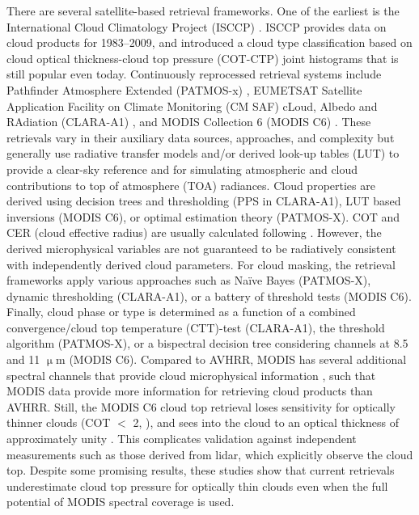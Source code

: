 There are several satellite-based retrieval frameworks. One of the earliest is the International Cloud Climatology Project (ISCCP) \citep{Rossow99}. ISCCP provides data on cloud products for 1983--2009, and introduced a cloud type classification based on cloud optical thickness-cloud top pressure (COT-CTP) joint histograms that is still popular even today. Continuously reprocessed retrieval systems include Pathfinder Atmosphere Extended (PATMOS-x) \citep{Heidinger09,Heidinger12}, EUMETSAT Satellite Application Facility on Climate Monitoring (CM SAF) cLoud, Albedo and RAdiation (CLARA-A1) \citep{Karlsson13}, and MODIS Collection 6 (MODIS C6) \citep{Platnick17}. These retrievals vary in their auxiliary data sources, approaches, and complexity but generally use radiative transfer models and/or derived look-up tables (LUT) to provide a clear-sky reference and for simulating atmospheric and cloud contributions to top of atmosphere (TOA) radiances. Cloud properties are derived using decision trees and thresholding (PPS in CLARA-A1), LUT based inversions (MODIS C6), or optimal estimation theory (PATMOS-X). COT and CER (cloud effective radius) are usually calculated following \citet{Nakajima90}. However, the derived microphysical variables are not guaranteed to be radiatively consistent with independently derived cloud parameters. For cloud masking, the retrieval frameworks apply various approaches such as Na\"{i}ve Bayes (PATMOS-X), dynamic thresholding (CLARA-A1), or a battery of threshold tests (MODIS C6). Finally, cloud phase or type is determined as a function of a combined convergence/cloud top temperature (CTT)-test (CLARA-A1), the \citet{Pavolonis05} threshold algorithm (PATMOS-X), or a bispectral decision tree considering channels at 8.5 and 11 $\upmu$m (MODIS C6). Compared to AVHRR, MODIS has several additional spectral channels that provide cloud microphysical information \citep{Platnick17}, such that MODIS data provide more information for retrieving cloud products than AVHRR. Still, the MODIS C6 cloud top retrieval loses sensitivity for optically thinner clouds (COT $<$ 2, \citet{Menzel10, Christensen13}), and sees into the cloud to an optical thickness of approximately unity \citep{Baum12}. This complicates validation against independent measurements such as those derived from lidar, which explicitly observe the cloud top. Despite some promising results, these studies show that current retrievals underestimate cloud top pressure for optically thin clouds even when the full potential of MODIS spectral coverage is used.

